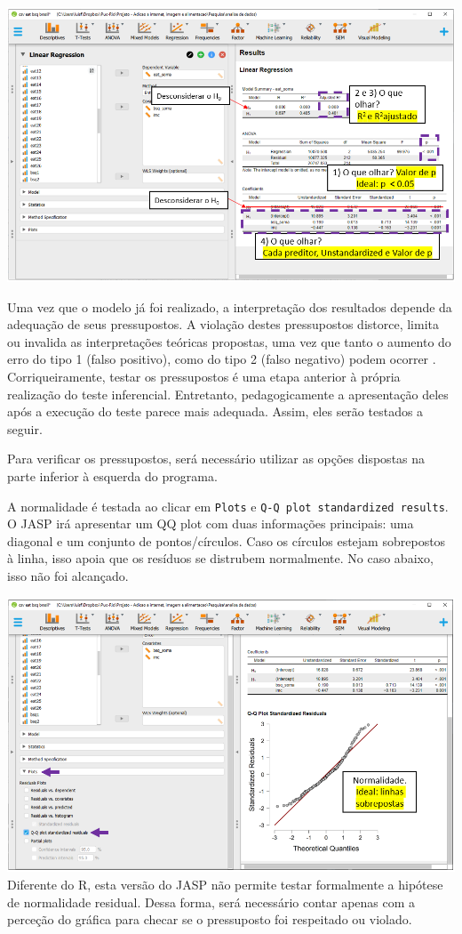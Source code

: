 \documentclass[
]{book}
\begin{document}
\includegraphics{./img/cap_reg_multipla_resultado_5.png}

Uma vez que o modelo já foi realizado, a interpretação dos resultados depende da adequação de seus pressupostos. A violação destes pressupostos distorce, limita ou invalida as interpretações teóricas propostas, uma vez que tanto o aumento do erro do tipo 1 (falso positivo), como do tipo 2 (falso negativo) podem ocorrer \citep{Lix1996, Barker2015, Ernst2017}. Corriqueiramente, testar os pressupostos é uma etapa anterior à própria realização do teste inferencial. Entretanto, pedagogicamente a apresentação deles após a execução do teste parece mais adequada. Assim, eles serão testados a seguir.

Para verificar os pressupostos, será necessário utilizar as opções dispostas na parte inferior à esquerda do programa.

A normalidade é testada ao clicar em \texttt{Plots} e \texttt{Q-Q\ plot\ standardized\ results}. O JASP irá apresentar um QQ plot com duas informações principais: uma diagonal e um conjunto de pontos/círculos. Caso os círculos estejam sobrepostos à linha, isso apoia que os resíduos se distrubem normalmente. No caso abaixo, isso não foi alcançado.

\includegraphics{./img/cap_reg_multipla_normalidade.png}
Diferente do R, esta versão do JASP não permite testar formalmente a hipótese de normalidade residual. Dessa forma, será necessário contar apenas com a perceção do gráfica para checar se o pressuposto foi respeitado ou violado.
\end{document}
